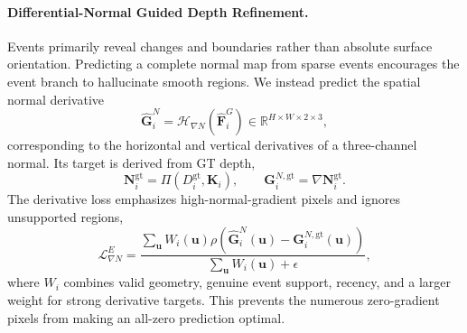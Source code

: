 \paragraph{Differential-Normal Guided Depth Refinement.}
\label{sec:event_normal_depth}

Events primarily reveal changes and boundaries rather than absolute surface
orientation. Predicting a complete normal map from sparse events encourages
the event branch to hallucinate smooth regions. We instead predict the spatial
normal derivative
\begin{equation}
    \widehat{\bm G}_i^{N}
    =\mathcal H_{\nabla N}(\widehat{\bm F}_i^{G})
    \in\mathbb R^{H\times W\times 2\times3},
\end{equation}
corresponding to the horizontal and vertical derivatives of a three-channel
normal. Its target is derived from GT depth,
\begin{equation}
    \bm N_i^{\mathrm{gt}}=\Pi(D_i^{\mathrm{gt}},\bm K_i),
    \qquad
    \bm G_i^{N,\mathrm{gt}}=\nabla\bm N_i^{\mathrm{gt}}.
\end{equation}
The derivative loss emphasizes high-normal-gradient pixels and ignores
unsupported regions,
\begin{equation}
    \mathcal L_{\nabla N}^{E}
    =\frac{\sum_{\bm u}W_i(\bm u)
    \rho(\widehat{\bm G}_i^{N}(\bm u)-
         \bm G_i^{N,\mathrm{gt}}(\bm u))}
    {\sum_{\bm u}W_i(\bm u)+\epsilon},
\end{equation}
where $W_i$ combines valid geometry, genuine event support, recency, and a
larger weight for strong derivative targets. This prevents the numerous
zero-gradient pixels from making an all-zero prediction optimal.

